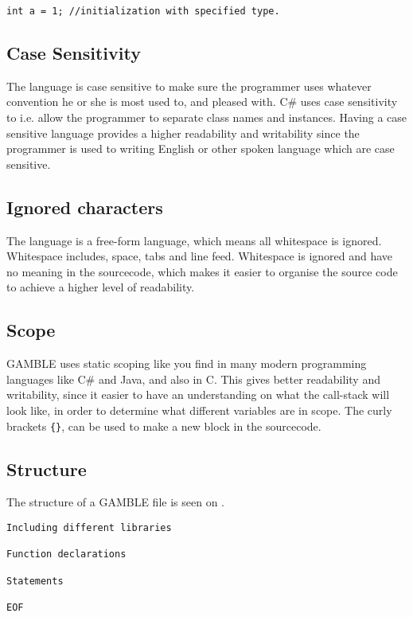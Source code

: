 \begin{lstlisting}[caption={Comment and Semicolon},label={lst:CommSemi}]
int a = 1; //initialization with specified type.
\end{lstlisting}

\subsection*{Case Sensitivity}
The language is case sensitive to make sure the programmer uses whatever convention he or she is most used to, and pleased with.
C\# uses case sensitivity to i.e. allow the programmer to separate class names and instances.
Having a case sensitive language provides a higher readability and writability since the programmer is used to writing English or other spoken language which are case sensitive.

\subsection*{Ignored characters}
The language is a free-form language, which means all whitespace is ignored.
Whitespace includes, space, tabs and line feed.
Whitespace is ignored and have no meaning in the sourcecode, which makes it easier to organise the source code to achieve a higher level of readability.

\subsection*{Scope}
GAMBLE uses static scoping like you find in many modern programming languages like C\# and Java, and also in C.
This gives better readability and writability, since it easier to have an understanding on what the call-stack will look like, in order to determine what different variables are in scope.
The curly brackets \texttt{\{\}}, can be used to make a new block in the sourcecode.

\subsection*{Structure} 
The structure of a GAMBLE file is seen on .

\begin{lstlisting}[caption={The structure of GABMLE files},label={lst:Structure}]
Including different libraries

Function declarations

Statements

EOF
\end{lstlisting}

